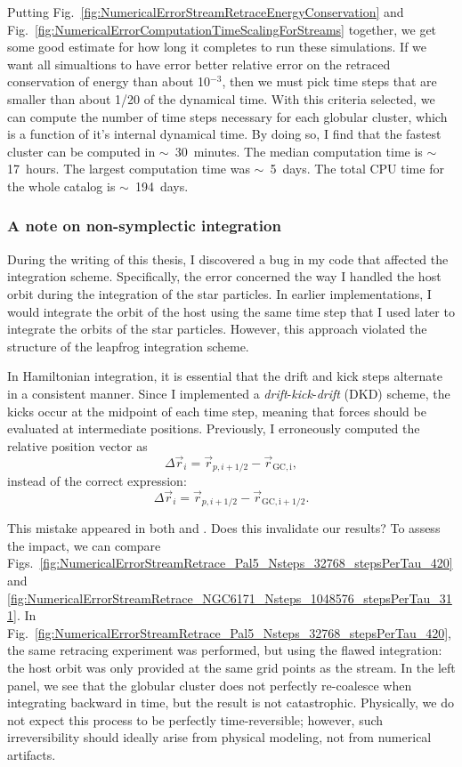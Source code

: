         Putting Fig.~\ref{fig:NumericalErrorStreamRetraceEnergyConservation} and Fig.~\ref{fig:NumericalErrorComputationTimeScalingForStreams} together, we get some good estimate for how long it completes to run these simulations. If we want all simualtions to have error better relative error on the retraced conservation of energy than about 10$^{-3}$, then we must pick time steps that are smaller than about 1/20 of the dynamical time. With this criteria selected, we can compute the number of time steps necessary for each globular cluster, which is a function of it's internal dynamical time. By doing so, I find that the fastest cluster can be computed in $\sim$~30~minutes. The median computation time is $\sim$17~hours. The largest computation time was $\sim$~5~days. The total CPU time for the whole catalog is $\sim$~194~days. 

        \subsubsection{A note on non-symplectic integration}

        During the writing of this thesis, I discovered a bug in my code that affected the integration scheme. Specifically, the error concerned the way I handled the host orbit during the integration of the star particles. In earlier implementations, I would integrate the orbit of the host using the same time step that I used later to integrate the orbits of the star particles. However, this approach violated the structure of the leapfrog integration scheme.

        In Hamiltonian integration, it is essential that the drift and kick steps alternate in a consistent manner. Since I implemented a \textit{drift}-\textit{kick}-\textit{drift} (DKD) scheme, the kicks occur at the midpoint of each time step, meaning that forces should be evaluated at intermediate positions. Previously, I erroneously computed the relative position vector as
        \[
        \Delta \vec{r}_i = \vec{r}_{p,i+1/2} - \vec{r}_\mathrm{GC,i},
        \]
        instead of the correct expression:
        \[
        \Delta \vec{r}_i = \vec{r}_{p,i+1/2} - \vec{r}_\mathrm{GC,i+1/2}.
        \]

        This mistake appeared in both \citet{2023A&A...673A..44F} and \citet{2025arXiv250203941F}. Does this invalidate our results? To assess the impact, we can compare Figs.~\ref{fig:NumericalErrorStreamRetrace_Pal5_Nsteps_32768_stepsPerTau_420} and \ref{fig:NumericalErrorStreamRetrace_NGC6171_Nsteps_1048576_stepsPerTau_311}. In Fig.~\ref{fig:NumericalErrorStreamRetrace_Pal5_Nsteps_32768_stepsPerTau_420}, the same retracing experiment was performed, but using the flawed integration: the host orbit was only provided at the same grid points as the stream. In the left panel, we see that the globular cluster does not perfectly re-coalesce when integrating backward in time, but the result is not catastrophic. Physically, we do not expect this process to be perfectly time-reversible; however, such irreversibility should ideally arise from physical modeling, not from numerical artifacts.

